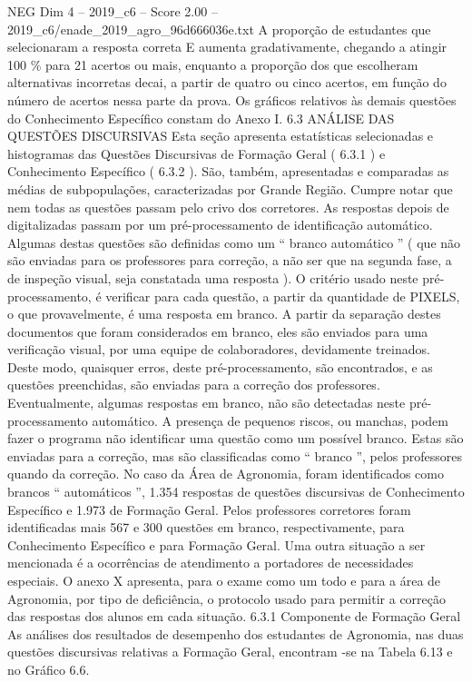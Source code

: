 \begin{textsample}{NEG Dim 4 – 2019\_c6 – Score 2.00 – 2019\_c6/enade\_2019\_agro\_96d666036e.txt}
A proporção de estudantes que selecionaram a resposta correta E aumenta gradativamente, chegando a atingir 100 \% para 21 acertos ou mais, enquanto a proporção dos que escolheram alternativas incorretas decai, a partir de quatro ou cinco acertos, em função do número de acertos nessa parte da prova.
Os gráficos relativos às demais questões do Conhecimento Específico constam do Anexo I. 6.3 ANÁLISE DAS QUESTÕES DISCURSIVAS Esta seção apresenta estatísticas selecionadas e histogramas das Questões Discursivas de Formação Geral ( 6.3.1 ) e Conhecimento Específico ( 6.3.2 ).
São, também, apresentadas e comparadas as médias de subpopulações, caracterizadas por Grande Região.
Cumpre notar que nem todas as questões passam pelo crivo dos corretores.
As respostas depois de digitalizadas passam por um pré-processamento de identificação automático.
Algumas destas questões são definidas como um “ branco automático ” ( que não são enviadas para os professores para correção, a não ser que na segunda fase, a de inspeção visual, seja constatada uma resposta ).
O critério usado neste pré-processamento, é verificar para cada questão, a partir da quantidade de PIXELS, o que provavelmente, é uma resposta em branco.
A partir da separação destes documentos que foram considerados em branco, eles são enviados para uma verificação visual, por uma equipe de colaboradores, devidamente treinados.
Deste modo, quaisquer erros, deste pré-processamento, são encontrados, e as questões preenchidas, são enviadas para a correção dos professores.
Eventualmente, algumas respostas em branco, não são detectadas neste pré-processamento automático.
A presença de pequenos riscos, ou manchas, podem fazer o programa não identificar uma questão como um possível branco.
Estas são enviadas para a correção, mas são classificadas como “ branco ”, pelos professores quando da correção.
No caso da Área de Agronomia, foram identificados como brancos “ automáticos ”, 1.354 respostas de questões discursivas de Conhecimento Específico e 1.973 de Formação Geral.
Pelos professores corretores foram identificadas mais 567 e 300 questões em branco, respectivamente, para Conhecimento Específico e para Formação Geral.
Uma outra situação a ser mencionada é a ocorrências de atendimento a portadores de necessidades especiais.
O anexo X apresenta, para o exame como um todo e para a área de Agronomia, por tipo de deficiência, o protocolo usado para permitir a correção das respostas dos alunos em cada situação. 6.3.1 Componente de Formação Geral As análises dos resultados de desempenho dos estudantes de Agronomia, nas duas questões discursivas relativas a Formação Geral, encontram -se na Tabela 6.13 e no Gráfico 6.6.

\end{textsample}
